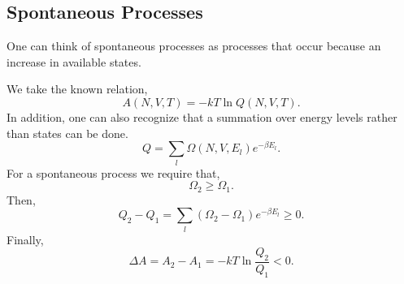 \subsection{Spontaneous Processes}
One can think of spontaneous processes as processes that occur because an
increase in available states.

We take the known relation,
\[ A(N, V, T) = -k T \ln Q(N, V, T).\]
In addition, one can also recognize that a summation over energy levels rather
than states can be done.
\[ Q = \sum_{l}{\Omega(N, V, E_{l}) e^{- \beta E_{l}}}.\]
For a spontaneous process we require that,
\[ \Omega_2 \geq \Omega_1.\]
Then,
\[ Q_2 - Q_1 = \sum_{l}{(\Omega_2 - \Omega_1) e^{-\beta E_{l}}} \geq 0.\]
Finally,
\[ \Delta A = A_2 - A_1 = - kT \ln \frac{Q_2}{Q_1} < 0.\]
